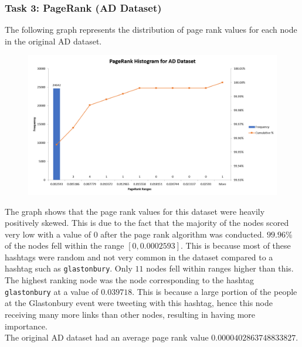 \documentclass[conference]{IEEEtran}
\begin{document}
		\subsubsection{Task 3: PageRank (AD Dataset)}
			{
				The following graph represents the distribution of page rank values for each node in the original AD dataset.
			\par}
			\begin{figure}[htbp]
				\centerline{\includegraphics[width=\linewidth]{./images/pagerank_ad.png}}
				\label{pagerank_ad}
			\end{figure}
			{
				The graph shows that the page rank values for this dataset were heavily positively skewed. This is due to the fact that the majority of the nodes scored very low with a value of 0 after the page rank algorithm was conducted. $99.96\%$ of the nodes fell within the range $[0, 0.0002593]$. This is because most of these hashtags were random and not very common in the dataset compared to a hashtag such as \texttt{glastonbury}. Only $11$ nodes fell within ranges higher than this. The highest ranking node was the node corresponding to the hashtag \texttt{glastonbury} at a value of $0.039718$. This is because a large portion of the people at the Glastonbury event were tweeting with this hashtag, hence this node receiving many more links than other nodes, resulting in having more importance.\\
				
				The original AD dataset had an average page rank value $0.0000402863748833827$.
			\par}
			
\end{document}
